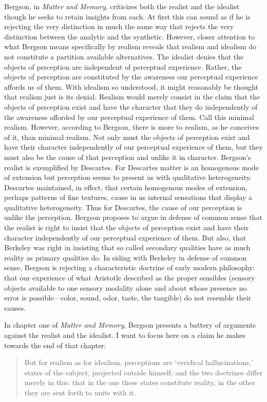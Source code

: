 \documentclass[12pt]{article}
\begin{document}
Bergson, in \emph{Matter and Memory}, criticizes both the realist and the idealist though he seeks to retain insights from each. At first this can sound as if he is rejecting the very distinction in much the same way that \citet{Quine:1951fk} rejects the very distinction between the analytic and the synthetic. However, closer attention to what Bergson means specifically by realism reveals that realism and idealism do not constitute a partition available alternatives. The idealist denies that the objects of perception are independent of perceptual experience. Rather, the objects of perception are constituted by the awareness our perceptual experience affords us of them. With idealism so understood, it might reasonably be thought that realism just is its denial. Realism would merely consist in the claim that the objects of perception exist and have the character that they do independently of the awareness afforded by our perceptual experience of them. Call this minimal realism. However, according to Bergson, there is more to realism, as he conceives of it, than minimal realism. Not only must the objects of perception exist and have their character independently of our perceptual experience of them, but they must also be the cause of that perception and unlike it in character. Bergson's realist is exemplified by Descartes. For Descartes matter is an homogenous mode of extension but perception seems to present us with qualitative heterogeneity. Descartes maintained, in effect, that certain homogenous modes of extension, perhaps patterns of fine textures, cause in us internal sensations that display a qualitative heterogeneity. Thus for Descartes, the cause of our perception is unlike the perception. Bergson proposes to argue in defense of common sense that the realist is right to insist that the objects of perception exist and have their character independently of our perceptual experience of them. But also, that Berkeley was right in insisting that so called secondary qualities have as much reality as primary qualities do. In siding with Berkeley in defense of common sense, Bergson is rejecting a characteristic doctrine of early modern philosophy: that our experience of what Aristotle described as the proper sensibles (sensory objects available to one sensory modality alone and about whose presence no error is possible---color, sound, odor, taste, the tangible) do not resemble their causes.

In chapter one of \emph{Matter and Memory}, Bergson presents a battery of arguments against the realist and the idealist. I want to focus here on a claim he makes towards the end of that chapter:
\begin{quote}
	But for realism as for idealism, perceptions are `veridical hallucinations,' states of the subject, projected outside himself; and the two doctrines differ merely in this: that in the one these states constitute reality, in the other they are sent forth to unite with it. \citep[73]{Bergson:1912pi}
\end{quote}
\end{document}
